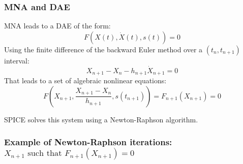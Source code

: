
\frame
{
\frametitle{MNA and DAE}
 \begin{block}{MNA leads to a DAE of the form:}
\[F(X(t),\dot X(t),s(t))=0\]
Using the finite difference of the backward Euler method over a $(t_{n},t_{n+1})$ interval:
\[X_{n+1}-X_{n}-h_{n+1} \dot X_{n+1}=0\]
That leads to a set of algebraic nonlinear equations:
\[F(X_{n+1}, \frac{X_{n+1}-X_n}{h_{n+1}},s(t_{n+1}))=F_{n+1}(X_{n+1})=0\]


SPICE solves this system using a Newton-Raphson algorithm.
  \end{block}

}

\frame
{
\frametitle{Example of Newton-Raphson iterations: $X_{n+1} \textrm{ such that } F_{n+1}(X_{n+1})=0$}

  \begin{figure}
   \centerline{
   \scalebox{0.9}{
    
    }
 } 
 \end{figure}


}
